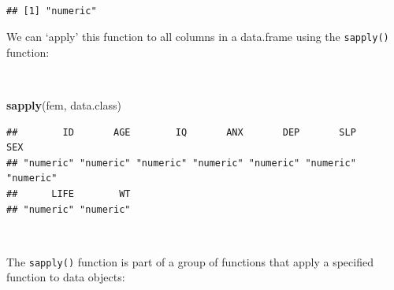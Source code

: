 \documentclass[12pt,a4paper]{book}
\newenvironment{Shaded}{\begin{snugshade}}{\end{snugshade}}
\newcommand{\KeywordTok}[1]{\textcolor[rgb]{0.13,0.29,0.53}{\textbf{#1}}}
\newcommand{\OperatorTok}[1]{\textcolor[rgb]{0.81,0.36,0.00}{\textbf{#1}}}
\newcommand{\NormalTok}[1]{#1}
\theoremstyle{definition}
\theoremstyle{definition}
\theoremstyle{definition}
\theoremstyle{remark}
\begin{document}
~

\begin{Shaded}
\end{Shaded}

\begin{verbatim}
## [1] "numeric"
\end{verbatim}

\newpage

We can `apply' this function to all columns in a data.frame using the
\texttt{sapply()} function:

~

\begin{Shaded}
\begin{Highlighting}[]
\KeywordTok{sapply}\NormalTok{(fem, data.class)}
\end{Highlighting}
\end{Shaded}

\begin{verbatim}
##        ID       AGE        IQ       ANX       DEP       SLP       SEX 
## "numeric" "numeric" "numeric" "numeric" "numeric" "numeric" "numeric" 
##      LIFE        WT 
## "numeric" "numeric"
\end{verbatim}

~

The \texttt{sapply()} function is part of a group of functions that
apply a specified function to data objects:
\end{document}

